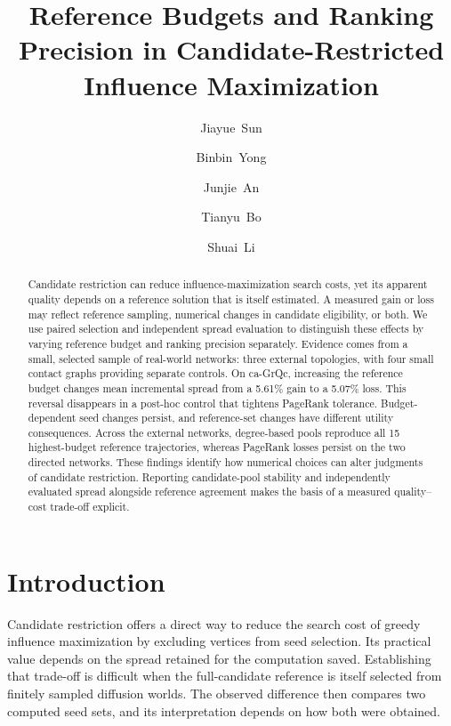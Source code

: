 \documentclass[smallextended]{svjour3}
\begin{document}
\title{Reference Budgets and Ranking Precision in Candidate-Restricted Influence Maximization}
\author{\mbox{Jiayue Sun} \and \mbox{Binbin Yong} \and \mbox{Junjie An} \and \mbox{Tianyu Bo} \and \mbox{Shuai Li}}
\date{}
\maketitle
\begin{abstract}
Candidate restriction can reduce influence-maximization search costs, yet its apparent quality depends on a reference solution that is itself estimated. A measured gain or loss may reflect reference sampling, numerical changes in candidate eligibility, or both. We use paired selection and independent spread evaluation to distinguish these effects by varying reference budget and ranking precision separately. Evidence comes from a small, selected sample of real-world networks: three external topologies, with four small contact graphs providing separate controls. On ca-GrQc, increasing the reference budget changes mean incremental spread from a 5.61\% gain to a 5.07\% loss. This reversal disappears in a post-hoc control that tightens PageRank tolerance. Budget-dependent seed changes persist, and reference-set changes have different utility consequences. Across the external networks, degree-based pools reproduce all 15 highest-budget reference trajectories, whereas PageRank losses persist on the two directed networks. These findings identify how numerical choices can alter judgments of candidate restriction. Reporting candidate-pool stability and independently evaluated spread alongside reference agreement makes the basis of a measured quality--cost trade-off explicit.
\end{abstract}

\section{Introduction}
Candidate restriction offers a direct way to reduce the search cost of greedy influence maximization by excluding vertices from seed selection. Its practical value depends on the spread retained for the computation saved. Establishing that trade-off is difficult when the full-candidate reference is itself selected from finitely sampled diffusion worlds. The observed difference then compares two computed seed sets, and its interpretation depends on how both were obtained.
\end{document}
